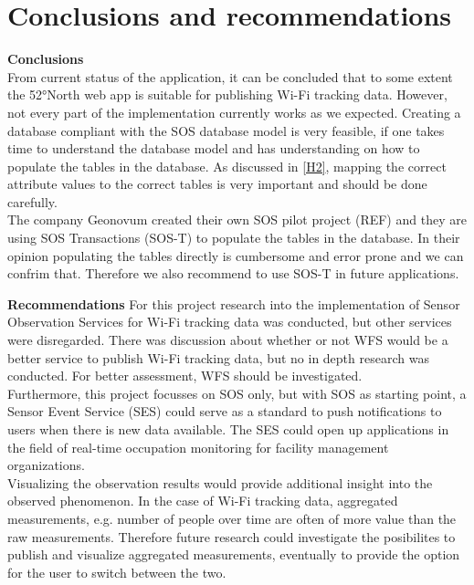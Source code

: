 \chapter{Conclusions and recommendations}
\textbf{Conclusions}\\
From current status of the application, it can be concluded that to some extent 
the 52°North web app is suitable for publishing Wi-Fi tracking data. However, 
not every part of the implementation currently works as we expected. Creating a 
database compliant with the SOS database model is very feasible, if one takes 
time to understand the database model and has understanding on how to populate 
the tables in the database. As discussed in \autoref{H2}, mapping the correct 
attribute values to the correct tables is very important and should be done 
carefully.\\
The company Geonovum created their own SOS pilot project (REF)
and they are using SOS Transactions (SOS-T) to populate the tables in the 
database. In their opinion populating the tables directly is cumbersome and 
error prone and we can confrim that. Therefore we also recommend to use 
SOS-T in future applications.

\textbf{Recommendations}
For this project research into the implementation of Sensor Observation 
Services for Wi-Fi tracking data was conducted, but other services were 
disregarded. There was discussion about whether or not WFS would be a better 
service to publish Wi-Fi tracking data, but no in depth research was conducted. 
For better assessment, WFS should be investigated.\\
Furthermore, this project focusses on SOS only, but with SOS as starting point, 
a Sensor Event Service (SES) could serve as a standard to push notifications to 
users when there is new data available. The SES could open up applications in 
the field of real-time occupation monitoring for facility management 
organizations.\\
Visualizing the observation results would provide additional insight into the 
observed phenomenon. In the case of Wi-Fi tracking data, aggregated 
measurements, e.g. number of people over time are often of more value than the 
raw measurements. Therefore future research could investigate the posibilites 
to publish and visualize aggregated measurements, eventually to provide the 
option for the user to switch between the two.


